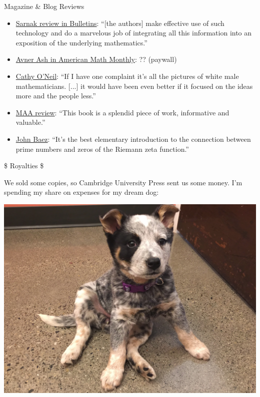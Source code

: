 \documentclass{beamer}
\begin{document}
\begin{frame}{Magazine \& Blog Reviews}
  \begin{itemize}
    \item \href{http://www.ams.org/journals/bull/2018-55-03/S0273-0979-2018-01624-8/}{Sarnak review in Bulletins}: ``[the authors] make effective use of such technology and do a marvelous job of integrating
all this information into an exposition of the underlying mathematics.''
    \item \href{https://www.tandfonline.com/doi/abs/10.1080/00029890.2018.1438005}{Avner Ash in American Math Monthly}: ?? (paywall)
    \item \href{https://mathbabe.org/2016/05/03/prime-numbers-and-the-riemann-hypothesis/}{Cathy O'Neil}: ``If I have one complaint it's all the pictures of white male mathematicians. [...] it would have been even better if it focused on the ideas more and the people less.''
    \item \href{https://www.maa.org/press/maa-reviews/prime-numbers-and-the-riemann-hypothesis}{MAA review}: ``This book is a splendid piece of work, informative and valuable.''
    \item \href{https://golem.ph.utexas.edu/category/2016/03/prime_numbers_and_the_riemann.html}{John Baez}: ``It's the best elementary introduction to the connection between prime numbers and zeros of the Riemann zeta function.''
  \end{itemize}
\end{frame}

\begin{frame}{\$ Royalties \$}

  We sold some copies, so Cambridge University Press sent us some money.
  I'm spending my share on expenses for my dream dog:

  \begin{center}
    \includegraphics[height=.7\textheight]{pics/bella-puppy}
  \end{center}


\end{frame}
\end{document}

